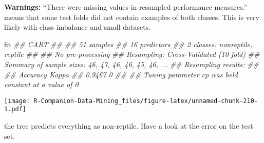 \documentclass[
  notitlepage]{book}
\newenvironment{Shaded}{\begin{snugshade}}{\end{snugshade}}
\newcommand{\CommentTok}[1]{\textcolor[rgb]{0.56,0.35,0.01}{\textit{#1}}}
\newcommand{\DataTypeTok}[1]{\textcolor[rgb]{0.13,0.29,0.53}{#1}}
\newcommand{\DecValTok}[1]{\textcolor[rgb]{0.00,0.00,0.81}{#1}}
\newcommand{\KeywordTok}[1]{\textcolor[rgb]{0.13,0.29,0.53}{\textbf{#1}}}
\newcommand{\NormalTok}[1]{#1}
\newcommand{\OperatorTok}[1]{\textcolor[rgb]{0.81,0.36,0.00}{\textbf{#1}}}
\begin{document}
\textbf{Warnings:} ``There were missing values in resampled performance
measures.'' means that some test folds did not contain examples of both
classes. This is very likely with class imbalance and small datasets.

\begin{Shaded}
\begin{Highlighting}[]
\NormalTok{fit}
\CommentTok{\#\# CART }
\CommentTok{\#\# }
\CommentTok{\#\# 51 samples}
\CommentTok{\#\# 16 predictors}
\CommentTok{\#\#  2 classes: \textquotesingle{}nonreptile\textquotesingle{}, \textquotesingle{}reptile\textquotesingle{} }
\CommentTok{\#\# }
\CommentTok{\#\# No pre{-}processing}
\CommentTok{\#\# Resampling: Cross{-}Validated (10 fold) }
\CommentTok{\#\# Summary of sample sizes: 46, 47, 46, 46, 45, 46, ... }
\CommentTok{\#\# Resampling results:}
\CommentTok{\#\# }
\CommentTok{\#\#   Accuracy  Kappa}
\CommentTok{\#\#   0.9467    0    }
\CommentTok{\#\# }
\CommentTok{\#\# Tuning parameter \textquotesingle{}cp\textquotesingle{} was held constant at a value of 0}
\end{Highlighting}
\end{Shaded}

\begin{Shaded}
\end{Shaded}

\texttt{[image: R-Companion-Data-Mining\_files/figure-latex/unnamed-chunk-210-1.pdf]}

the tree predicts everything as non-reptile. Have a look at the error on
the test set.
\end{document}
